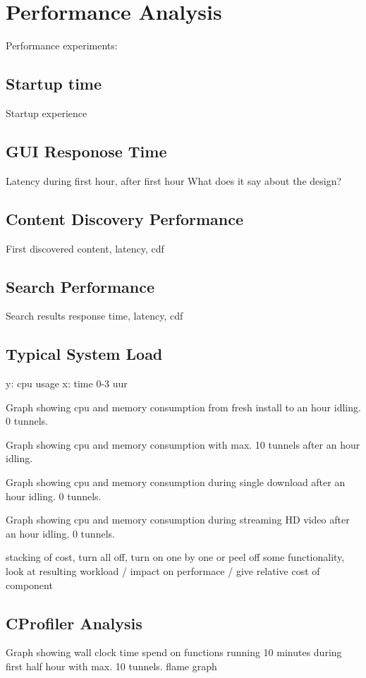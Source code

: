 \documentclass[]{report}
\begin{document}
\chapter{Performance Analysis}
Performance experiments:

\section{Startup time}
Startup experience

\section{GUI Responose Time}
Latency during first hour, after first hour
What does it say about the design?

\section{Content Discovery Performance}
First discovered content, latency, cdf

\section{Search Performance}
Search results response time, latency, cdf





\section{Typical System Load}
y: cpu usage
x: time 0-3 uur

Graph showing cpu and memory consumption from fresh install to an hour idling. 0 tunnels.

Graph showing cpu and memory consumption with max. 10 tunnels after an hour idling.

Graph showing cpu and memory consumption during single download after an hour idling. 0 tunnels.

Graph showing cpu and memory consumption during streaming HD video after an hour idling. 0 tunnels.



stacking of cost, turn all off, turn on one by one or peel off some functionality, look at resulting workload / impact on performace / give relative cost of component

\section{CProfiler Analysis}
Graph showing wall clock time spend on functions running 10 minutes during first half hour with max. 10 tunnels.
flame graph
\end{document}
